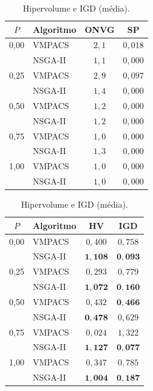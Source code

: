 \documentclass[11pt]{article}
\begin{document}
\begin{table}[H]
\centering\small
\begin{minipage}{0.48\textwidth}\centering
\caption{ONVG e \emph{Spacing} (média).}
\label{tab:t1}
\begin{tabular}{clcc}
\toprule
$P$ & Algoritmo & ONVG & SP \\
\midrule
0{,}00 & VMPACS  & $2{,}1$ & $0{,}018$ \\
       & NSGA-II & $1{,}1$ & $0{,}000$ \\
0{,}25 & VMPACS  & $2{,}9$ & $0{,}097$ \\
       & NSGA-II & $1{,}4$ & $0{,}000$ \\
0{,}50 & VMPACS  & $1{,}2$ & $0{,}000$ \\
       & NSGA-II & $1{,}2$ & $0{,}000$ \\
0{,}75 & VMPACS  & $1{,}0$ & $0{,}000$ \\
       & NSGA-II & $1{,}3$ & $0{,}000$ \\
1{,}00 & VMPACS  & $1{,}0$ & $0{,}000$ \\
       & NSGA-II & $1{,}0$ & $0{,}000$ \\
\bottomrule
\end{tabular}
\end{minipage}\hfill
\begin{minipage}{0.48\textwidth}\centering
\caption{Hipervolume e IGD (média).}
\label{tab:t3}
\begin{tabular}{clcc}
\toprule
$P$ & Algoritmo & HV & IGD \\
\midrule
0{,}00 & VMPACS  & $0{,}400$ & $0{,}758$ \\
       & NSGA-II & $\mathbf{1{,}108}$ & $\mathbf{0{,}093}$ \\
0{,}25 & VMPACS  & $0{,}293$ & $0{,}779$ \\
       & NSGA-II & $\mathbf{1{,}072}$ & $\mathbf{0{,}160}$ \\
0{,}50 & VMPACS  & $0{,}432$ & $\mathbf{0{,}466}$ \\
       & NSGA-II & $\mathbf{0{,}478}$ & $0{,}629$ \\
0{,}75 & VMPACS  & $0{,}024$ & $1{,}322$ \\
       & NSGA-II & $\mathbf{1{,}127}$ & $\mathbf{0{,}077}$ \\
1{,}00 & VMPACS  & $0{,}347$ & $0{,}785$ \\
       & NSGA-II & $\mathbf{1{,}004}$ & $\mathbf{0{,}187}$ \\
\bottomrule
\end{tabular}
\end{minipage}
\end{table}
\end{document}
